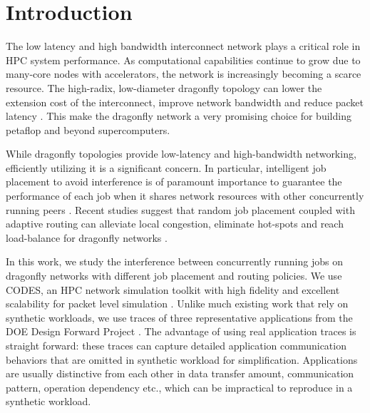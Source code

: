 \documentclass[conference,compsoc]{IEEEtran}
\begin{document}




%
\IEEEpeerreviewmaketitle



\section{Introduction}
\label{sec:intro}

The low latency and high bandwidth interconnect network plays a critical role in HPC system performance. As computational capabilities continue to grow due to many-core nodes with accelerators, the network is increasingly becoming a scarce resource. The high-radix, low-diameter dragonfly topology can lower the extension cost of the interconnect, improve network bandwidth and reduce packet latency \cite{dally-dragonfly}. This make the dragonfly network a very promising choice for building petaflop and beyond supercomputers. 


While dragonfly topologies provide low-latency and high-bandwidth networking, efficiently utilizing it is a significant concern. In particular, intelligent job placement to avoid interference is of paramount importance to guarantee the performance of each job when it shares network resources with other concurrently running peers \cite{bhatele2015, dskinner}. Recent studies suggest that random job placement coupled with adaptive routing can alleviate local congestion, eliminate hot-spots and reach load-balance for dragonfly networks \cite{jain-sc14, bhatele-sc11, brandt2014}. 


In this work, we study the interference between concurrently running jobs on dragonfly networks with different job placement and routing policies. We use CODES, an HPC network simulation toolkit with high fidelity and excellent scalability for packet level simulation \cite{codes}. Unlike much existing work that rely on synthetic workloads, we use traces of three representative applications from the DOE Design Forward Project \cite{designforwardwebpage}. The advantage of using real application traces is straight forward: these traces can capture detailed application communication behaviors that are  omitted in synthetic workload for simplification. Applications are usually distinctive from each other in data transfer amount, communication pattern, operation dependency etc., which can be impractical to reproduce in a synthetic workload.
\end{document}
